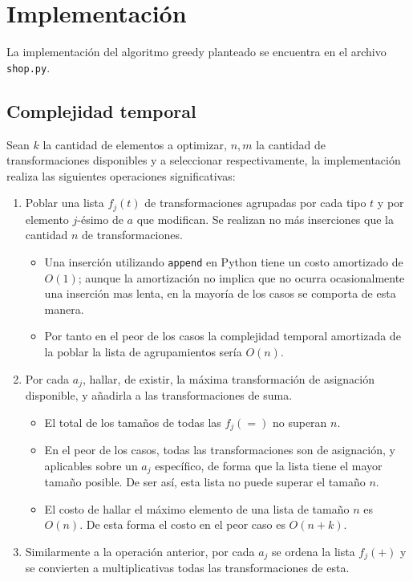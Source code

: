 \documentclass{article}
\theoremstyle{default}
\begin{document}
\section{Implementación}
La implementación del algoritmo greedy planteado se encuentra en el archivo \texttt{shop.py}.
%
\subsection{Complejidad temporal}
	Sean $k$ la cantidad de elementos a optimizar, $n, m$ la cantidad de transformaciones disponibles y a seleccionar respectivamente, la implementación realiza las siguientes operaciones significativas:
	\begin{enumerate}
		\item Poblar una lista $f_j(t)$ de transformaciones agrupadas por cada tipo $t$ y por elemento $j$-ésimo de $a$ que modifican. Se realizan no más inserciones que la cantidad $n$ de transformaciones.
		\begin{itemize}
			\item Una inserción utilizando \texttt{append} en Python tiene un costo amortizado de $O(1)$; aunque la amortización no implica que no ocurra ocasionalmente una inserción mas lenta, en la mayoría de los casos se comporta de esta manera.
			\item Por tanto en el peor de los casos la complejidad temporal amortizada de la poblar la lista de agrupamientos sería $O(n)$.
		\end{itemize}
%
		\item Por cada $a_j$, hallar, de existir, la máxima transformación de asignación disponible, y añadirla a las transformaciones de suma.
		\begin{itemize}
			\item El total de los tamaños de todas las $f_j(=)$ no superan $n$.
			\item En el peor de los casos, todas las transformaciones son de asignación, y aplicables sobre un $a_j$ específico, de forma que la lista tiene el mayor tamaño posible. De ser así, esta lista no puede superar el tamaño $n$.
			\item El costo de hallar el máximo elemento de una lista de tamaño $n$ es $O(n)$. De esta forma el costo en el peor caso es $O(n + k)$.
		\end{itemize}
%
		\item Similarmente a la operación anterior, por cada $a_j$ se ordena la lista $f_j(+)$ y se convierten a multiplicativas todas las transformaciones de esta.
		\begin{itemize}

\end{itemize}
\end{enumerate}
\end{document}
